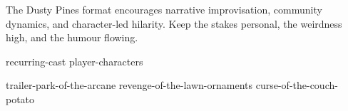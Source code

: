 The Dusty Pines format encourages narrative improvisation, community dynamics, and character-led hilarity. Keep the stakes personal, the weirdness high, and the humour flowing.

{recurring-cast}
{player-characters}

{trailer-park-of-the-arcane}
{revenge-of-the-lawn-ornaments}
{curse-of-the-couch-potato}

